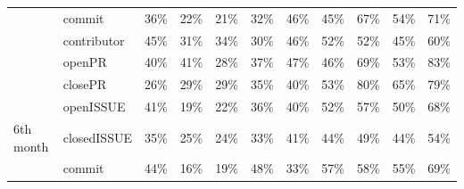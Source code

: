 \documentclass[smallextended]{svjour3}
\begin{document}
\begin{table}[!t]
{\begin{tabular}{llccccccccc}
                                     & commit                               & \cellcolor[HTML]{D8D8D8}36\% & \cellcolor[HTML]{EBEBEB}22\% & \cellcolor[HTML]{EDEDED}21\% & \cellcolor[HTML]{DEDEDE}32\% & \cellcolor[HTML]{C6C6C6}46\% & \cellcolor[HTML]{C9C9C9}45\% & \cellcolor[HTML]{929292}67\% & \cellcolor[HTML]{B3B3B3}54\% & \cellcolor[HTML]{888888}71\% \\
                                     & contributor                          & \cellcolor[HTML]{C9C9C9}45\% & \cellcolor[HTML]{DEDEDE}31\% & \cellcolor[HTML]{DBDBDB}34\% & \cellcolor[HTML]{E0E0E0}30\% & \cellcolor[HTML]{C7C7C7}46\% & \cellcolor[HTML]{B9B9B9}52\% & \cellcolor[HTML]{B8B8B8}52\% & \cellcolor[HTML]{C9C9C9}45\% & \cellcolor[HTML]{A3A3A3}60\% \\
                                     & openPR                               & \cellcolor[HTML]{D3D3D3}40\% & \cellcolor[HTML]{D1D1D1}41\% & \cellcolor[HTML]{E4E4E4}28\% & \cellcolor[HTML]{D7D7D7}37\% & \cellcolor[HTML]{C4C4C4}47\% & \cellcolor[HTML]{C7C7C7}46\% & \cellcolor[HTML]{8C8C8C}69\% & \cellcolor[HTML]{B5B5B5}53\% & \cellcolor[HTML]{696969}83\% \\
                                     & closePR                              & \cellcolor[HTML]{E6E6E6}26\% & \cellcolor[HTML]{E1E1E1}29\% & \cellcolor[HTML]{E2E2E2}29\% & \cellcolor[HTML]{DADADA}35\% & \cellcolor[HTML]{D2D2D2}40\% & \cellcolor[HTML]{B6B6B6}53\% & \cellcolor[HTML]{717171}80\% & \cellcolor[HTML]{979797}65\% & \cellcolor[HTML]{737373}79\% \\
                                     & openISSUE                            & \cellcolor[HTML]{D1D1D1}41\% & \cellcolor[HTML]{F0F0F0}19\% & \cellcolor[HTML]{ECECEC}22\% & \cellcolor[HTML]{D7D7D7}36\% & \cellcolor[HTML]{D2D2D2}40\% & \cellcolor[HTML]{B9B9B9}52\% & \cellcolor[HTML]{ACACAC}57\% & \cellcolor[HTML]{BCBCBC}50\% & \cellcolor[HTML]{8F8F8F}68\% \\
\multirow{-6}{*}{6th month}          & closedISSUE                          & \cellcolor[HTML]{D9D9D9}35\% & \cellcolor[HTML]{E7E7E7}25\% & \cellcolor[HTML]{E9E9E9}24\% & \cellcolor[HTML]{DCDCDC}33\% & \cellcolor[HTML]{D1D1D1}41\% & \cellcolor[HTML]{CDCDCD}44\% & \cellcolor[HTML]{BFBFBF}49\% & \cellcolor[HTML]{CDCDCD}44\% & \cellcolor[HTML]{B3B3B3}54\% \\ \hline
                                     & commit                               & \cellcolor[HTML]{CDCDCD}44\% & \cellcolor[HTML]{F3F3F3}16\% & \cellcolor[HTML]{F0F0F0}19\% & \cellcolor[HTML]{C3C3C3}48\% & \cellcolor[HTML]{DDDDDD}33\% & \cellcolor[HTML]{ADADAD}57\% & \cellcolor[HTML]{A8A8A8}58\% & \cellcolor[HTML]{B0B0B0}55\% & \cellcolor[HTML]{8D8D8D}69\% \\

\end{tabular}}
\end{table}
\end{document}
